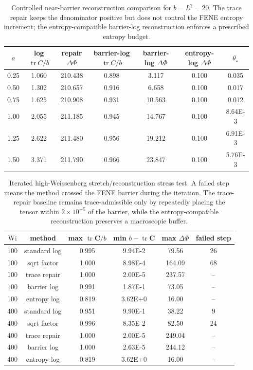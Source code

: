 ﻿\documentclass[11pt]{amsart}
\newcommand{\CC}{\bm C}
\newcommand{\Wi}{\mathrm{Wi}}
\newcommand{\tr}{\operatorname{tr}}
\begin{document}
\begin{table}[htbp]
\centering
\caption{Controlled near-barrier reconstruction comparison for $b=L^2=20$.  The trace repair keeps the denominator positive but does not control the FENE entropy increment; the entropy-compatible barrier-log reconstruction enforces a prescribed entropy budget.}
\label{tab:trace-repair-comparison}
\begin{tabular}{ccccccc}
\toprule
$a$ & log $\tr C/b$ & repair $\Delta\Phi$ & barrier-log $\tr C/b$ & barrier-log $\Delta\Phi$ & entropy-log $\Delta\Phi$ & $\theta_\star$ \\
\midrule
0.25 & 1.060 & 210.438 & 0.898 & 3.117 & 0.100 & 0.035 \\
0.50 & 1.302 & 210.657 & 0.916 & 6.658 & 0.100 & 0.017 \\
0.75 & 1.625 & 210.908 & 0.931 & 10.563 & 0.100 & 0.012 \\
1.00 & 2.055 & 211.185 & 0.945 & 14.767 & 0.100 & 8.64E-3 \\
1.25 & 2.622 & 211.480 & 0.956 & 19.212 & 0.100 & 6.91E-3 \\
1.50 & 3.371 & 211.790 & 0.966 & 23.847 & 0.100 & 5.76E-3 \\
\bottomrule
\end{tabular}

\end{table}

\begin{table}[htbp]
\centering
\caption{Iterated high-Weissenberg stretch/reconstruction stress test.  A failed step means the method crossed the FENE barrier during the iteration.  The trace-repair baseline remains trace-admissible only by repeatedly placing the tensor within $2\times10^{-5}$ of the barrier, while the entropy-compatible reconstruction preserves a macroscopic buffer.}
\label{tab:highwi-repair-comparison}
\small
\setlength{\tabcolsep}{4pt}
\begin{tabular}{cccccc}
\toprule
$\Wi$ & method & max $\tr\CC/b$ & min $b-\tr\CC$ & max $\Delta\Phi$ & failed step \\
\midrule
100 & standard log & 0.995 & 9.94E-2 & 79.56 & 26 \\
100 & sqrt factor & 1.000 & 8.98E-4 & 164.09 & 68 \\
100 & trace repair & 1.000 & 2.00E-5 & 237.57 & -- \\
100 & barrier log & 0.991 & 1.87E-1 & 73.05 & -- \\
100 & entropy log & 0.819 & 3.62E+0 & 16.00 & -- \\
400 & standard log & 0.951 & 9.90E-1 & 38.22 & 9 \\
400 & sqrt factor & 0.996 & 8.35E-2 & 82.50 & 24 \\
400 & trace repair & 1.000 & 2.00E-5 & 249.04 & -- \\
400 & barrier log & 1.000 & 2.63E-5 & 244.12 & -- \\
400 & entropy log & 0.819 & 3.62E+0 & 16.00 & -- \\
\bottomrule
\end{tabular}
\end{table}
\end{document}
